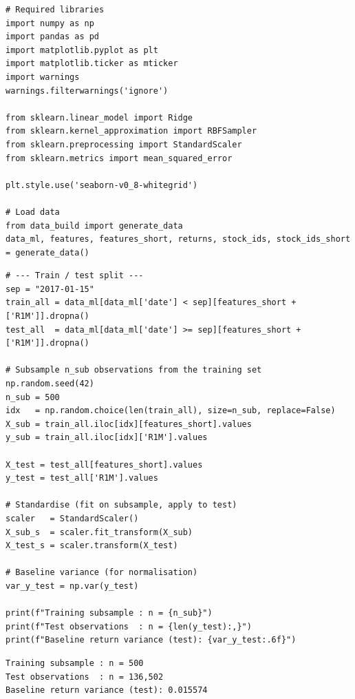 \begin{verbatim}
# Required libraries
import numpy as np
import pandas as pd
import matplotlib.pyplot as plt
import matplotlib.ticker as mticker
import warnings
warnings.filterwarnings('ignore')

from sklearn.linear_model import Ridge
from sklearn.kernel_approximation import RBFSampler
from sklearn.preprocessing import StandardScaler
from sklearn.metrics import mean_squared_error

plt.style.use('seaborn-v0_8-whitegrid')

# Load data
from data_build import generate_data
data_ml, features, features_short, returns, stock_ids, stock_ids_short = generate_data()
\end{verbatim}

\begin{verbatim}
# --- Train / test split ---
sep = "2017-01-15"
train_all = data_ml[data_ml['date'] < sep][features_short + ['R1M']].dropna()
test_all  = data_ml[data_ml['date'] >= sep][features_short + ['R1M']].dropna()

# Subsample n_sub observations from the training set
np.random.seed(42)
n_sub = 500
idx   = np.random.choice(len(train_all), size=n_sub, replace=False)
X_sub = train_all.iloc[idx][features_short].values
y_sub = train_all.iloc[idx]['R1M'].values

X_test = test_all[features_short].values
y_test = test_all['R1M'].values

# Standardise (fit on subsample, apply to test)
scaler   = StandardScaler()
X_sub_s  = scaler.fit_transform(X_sub)
X_test_s = scaler.transform(X_test)

# Baseline variance (for normalisation)
var_y_test = np.var(y_test)

print(f"Training subsample : n = {n_sub}")
print(f"Test observations  : n = {len(y_test):,}")
print(f"Baseline return variance (test): {var_y_test:.6f}")
\end{verbatim}

\begin{verbatim}
Training subsample : n = 500
Test observations  : n = 136,502
Baseline return variance (test): 0.015574
\end{verbatim}

